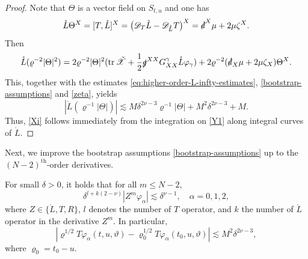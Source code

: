 \documentclass[11pt,twoside]{article}
\def\al{\alpha}
\def\de{\delta}
\def\vp{\varphi}
\def\f{\frac}
\def\les{\lesssim}
\begin{document}
\begin{proof}
 Note that $\Theta$ is a vector field on $S_{t, u}$ and one has
 \begin{equation}\label{LXi}
 \mathring L\Theta^X=[T,\mathring L]^X=\big(\mathscr{D}_T\mathring L-\mathscr{D}_{\mathring L}T\big)^X=\slashed d^X\mu+2\mu\zeta^X.
 \end{equation}
 Then
 \[
 \mathring L(\varrho^{-2}|\Theta|^2)=2\varrho^{-2}|\Theta|^2(\operatorname{tr}\check{\mathscr X}+\f12\slashed g^{XX}G_{XX}^\gamma\mathring L\vp_\gamma)+2\varrho^{-2}(\slashed d_X\mu
 +2\mu\zeta_X)\Theta^X.
 \]
 This, together with the estimates \eqref{eq:higher-order-L-infty-estimates}, \eqref{bootstrap-assumptions} and \eqref{zeta}, yields
 \begin{equation}\label{Y1}
 |\mathring L(\varrho^{-1}|\Theta|)|\lesssim M\delta^{2\nu-3} \varrho^{-1}|\Theta| + M^2\delta^{2\nu-3}+M.
 \end{equation}
 Thus, \eqref{Xi} follows immediately from the integration on \eqref{Y1} along integral curves of $\mathring L$.
\end{proof}

Next, we improve the bootstrap assumptions \eqref{bootstrap-assumptions} up to the $(N-2)^{\text{th}}$-order derivatives.

\begin{proposition}\label{prop:bootstrap-higher-derivatives}
 For small $\de > 0$, it holds that for all $m \leq N-2$,
 \begin{equation}\label{eq:bootstrap-higher-derivatives}
 \de^{l+k(2-\nu)}| Z^{m} \vp_{\al} |\les \de^{\nu-1}, \quad \al = 0,1,2,
 \end{equation}
 where $Z \in \{ \mathring{L}, T, R \}$, $l$ denotes the number of $T$ operator, and $k$ the number of $\mathring{L}$ operator in the derivative $Z^{m}$. In particular,
 \begin{equation}\label{Tvp}
 |\varrho^{1/2}T\vp_\al(t,u,\vartheta)-\varrho_0^{1/2}T\vp_\al(t_0,u,\vartheta)|\lesssim M^2\delta^{2\nu-3},
 \end{equation}
 where $\varrho_0=t_0-u$.
\end{proposition}
\end{document}

